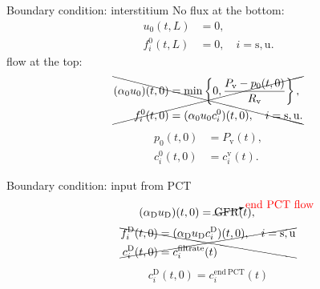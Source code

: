 \documentclass{beamer}
\begin{document}
\begin{frame}{Boundary condition: interstitium}
    No flux at the bottom:
    \begin{align}
        u_0(t,L) &= 0,\\ 
        f_i^0(t,L)&=0,\quad i=\mathrm{s},\mathrm{u}.
    \end{align}
     flow at the top:
    \begin{equation*}
        \xcancel{
            \begin{aligned}
                (\alpha_0u_0)(t,0) &= \min\left\{ 0,\frac{P_{\mathrm{v}}-p_0(t,0) }{R_{\mathrm{v}}}\right\},\\ 
                f_i^0(t,0) &= (\alpha_0 u_0 c_i^0)(t,0),\quad i=\mathrm{s},\mathrm{u}.
            \end{aligned}
        }
    \end{equation*}
    {\color{red}
    \begin{align}
        p_0(t,0) &= P_\mathrm{v}(t),\\ 
        c_i^0(t,0) &= c_i^\mathrm{v}(t).
    \end{align}}
\end{frame}

\begin{frame}{Boundary condition: input from PCT}
    \begin{equation}
        (\alpha_\mathrm{D} u_\mathrm{D})(t,0) = \cancelto{{\color{red}\mathrm{end\ PCT\ flow}}}{\mathrm{GFR}}(t),\qquad
    \end{equation}
    \begin{equation*}
        \xcancel{
            \begin{aligned}
                f_i^\mathrm{D}(t,0) &= (\alpha_\mathrm{D}u_\mathrm{D}c_i^\mathrm{D})(t,0),\quad i=\mathrm{s,u}\\
            c_i^\mathrm{D}(t,0) &= c_{i}^{\mathrm{filtrate}}(t)
            \end{aligned}
        }
    \end{equation*}
    {\color{red}\begin{align}
        c_i^\mathrm{D}(t,0) = c_i^\mathrm{end\ PCT}(t)
    \end{align}}
\end{frame}
\end{document}
